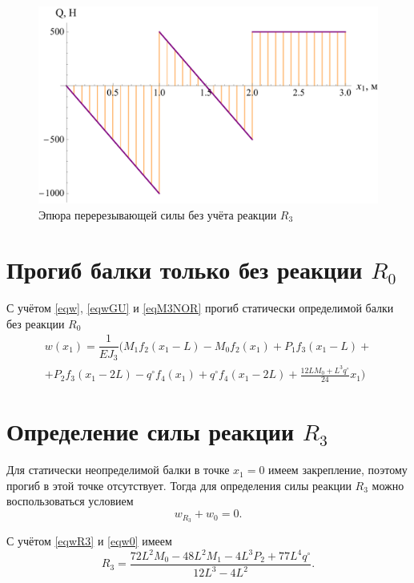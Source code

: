 \documentclass[12pt, a4paper]{article}
\begin{document}
	\begin{figure}[!h]
		\centering
		\includegraphics[width=0.7\linewidth]{plot-9}
		\caption{Эпюра перерезывающей силы без учёта реакции $R_3$}
	\end{figure}
	
	\vspace{-0.75em}
	
	
	\section{Прогиб балки только без реакции $R_0$} 
	
	С учётом \eqref{eqw}, \eqref{eqwGU} и \eqref{eqM3NOR} прогиб статически определимой балки без реакции $R_0$
	\begin{equation} 
		\begin{split}
			w(x_1) = \dfrac{1}{E J_3} \bigg( M_1 f_2(x_1 - L) - M_0 f_2(x_1) + P_1 f_3(x_1 - L) + \\ + P_2 f_3(x_1 - 2L) - q^{\circ} f_4(x_1) + q^{\circ} f_4(x_1 - 2L) +  \frac{12 L M_0 + L^3 q^{\circ}}{24} x_1 \bigg)
		\end{split}
		\label{eqw0}
	\end{equation}
	
	\section{Определение силы реакции $R_3$} 
	
	Для статически неопределимой балки в точке $x_1 = 0$ имеем закрепление, поэтому  прогиб в этой точке отсутствует. Тогда для определения силы реакции $R_3$ можно воспользоваться условием 
	\[
	w_{R_3} + w_0 = 0.
	\]
	
	С учётом \eqref{eqwR3} и \eqref{eqw0} имеем
	\begin{equation*}
		R_3 = \dfrac{72 L^2 M_0 - 48 L^2 M_1 - 4 L^3 P_2 + 77 L^4 q^{\circ}}{12 L^3 - 4 L^2}.
	\end{equation*}
	
\end{document}
